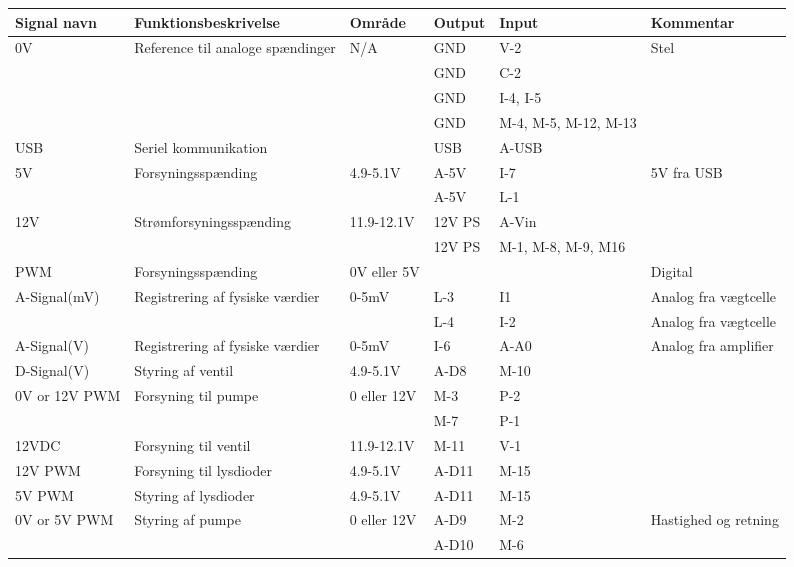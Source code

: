 \begin{center}
		\begin{longtable}{ | m{2cm} | m{5.5cm}| m{2cm}| m{1.250cm}| m{1.250cm}| m{2.5cm}| } 
			\hline
			\textbf{Signal navn} &\textbf{Funktionsbeskrivelse} &\textbf{Område} & \textbf{Output} & \textbf{Input} &\textbf{Kommentar}\\ 
			\hline
			\multirow{2}{*}{0V} &  \multirow{2}{*}{Reference til analoge  spændinger} & N/A & GND & V-2  & Stel \\ 
& & & GND & C-2 &   \\
& & & GND & I-4, I-5 &   \\
& & & GND & M-4, M-5, M-12, M-13 &   \\
			\hline	
			USB &  Seriel kommunikation & & USB & A-USB &  \\ 
			\hline	
			5V & \multirow{2}{*}{Forsyningsspænding} & 4.9-5.1V & A-5V & I-7 & 5V fra USB  \\ 
& & & A-5V & L-1 & \\
			\hline
			12V & \multirow{2}{*}{Strømforsyningsspænding} & 11.9-12.1V & 12V PS & A-Vin & \\
			& & & 12V PS & M-1, M-8, M-9, M16 &   \\ 
			\hline
			PWM & Forsyningsspænding & 0V eller 5V & &  & Digital \\ 
			\hline	
			A-Signal(mV) &\multirow{2}{*}{Registrering af fysiske værdier}  & 0-5mV & L-3 & I1 & Analog fra vægtcelle \\ 
			& & & L-4 & I-2 &  Analog fra vægtcelle \\
			\hline
			A-Signal(V) & Registrering af fysiske værdier & 0-5mV & I-6 & A-A0 & Analog fra amplifier\\ 
			\hline
			D-Signal(V) & Styring af ventil & 4.9-5.1V & A-D8 &M-10 & \\ 
			\hline
			0V or 12V PWM & \multirow{2}{*}{Forsyning til pumpe} & 0 eller 12V & M-3 & P-2 & \\
			& & & M-7 & P-1 & \\
			\hline	
			12VDC & Forsyning til ventil & 11.9-12.1V & M-11 & V-1 &  \\
			\hline
			12V PWM & Forsyning til lysdioder & 4.9-5.1V & A-D11 & M-15 &  \\
			\hline
			5V PWM & Styring af lysdioder & 4.9-5.1V & A-D11 & M-15 &  \\
			\hline
			0V or 5V PWM & \multirow{2}{*}{Styring af pumpe} & 0 eller 12V & A-D9 & M-2 & Hastighed og retning\\
			& & & A-D10 & M-6 & \\
			\hline
		\end{longtable}
	\end{center}


